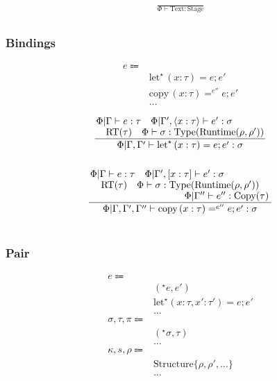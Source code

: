 \documentclass {article}
\begin{document}
\begin{gather*}
\frac
{}
{\Phi \vdash \text{Text} : \text{Stage}} \\
\end{gather*}

\subsubsection{Bindings}
\begin{align*}
e \Coloneqq & \\
& \text{let}^\star \, (x : \tau) = e; e' \tag{Runtime Let} \\
& \text{copy} \, (x : \tau) =^{e''} e; e' \tag{Runtime Copy Let} \\
& \dots
\end{align*}

\begin{gather*}
\frac
{\splitfrac{ \Phi | \Gamma \vdash e : \tau \quad \Phi | \Gamma', \langle x : \tau \rangle \vdash e' : \sigma}
{\text{RT}(\tau) \quad \Phi \vdash \sigma : \text{Type}(\text{Runtime}(\rho, \rho')) }}
{\Phi | \Gamma, \Gamma' \vdash \text{let}^\star \, (x : \tau) = e; e' : \sigma} \\
\\
\frac
{\splitfrac{ \Phi | \Gamma \vdash e : \tau \quad \Phi | \Gamma', [ x : \tau ] \vdash e' : \sigma}
{\splitfrac{\text{RT}(\tau) \quad \Phi \vdash \sigma : \text{Type}(\text{Runtime}(\rho, \rho')) }
{\Phi | \Gamma'' \vdash e'' : \text{Copy}(\tau)}}
}
{\Phi | \Gamma, \Gamma', \Gamma'' \vdash \text{copy} \, (x : \tau) =^{e''} e; e' : \sigma} \\
\end{gather*}

\begin{gather*}
\end{gather*}


\subsubsection{Pair}
\begin{align*}
e \Coloneqq & \\
& (^\star e, e') \tag{Runtime Pair Introduction} \\
& \text{let}^\star (x : \tau, x' : \tau') = e; e' \tag{Runtime Pair Elimination} \\
& \dots \\
\sigma, \tau, \pi \Coloneqq & \\
& (^\star \sigma, \tau) \tag{Runtime Pair} \\
& \dots \\
\kappa, s, \rho \Coloneqq & \\
& \text{Structure} \{ \rho, \rho', \dots \} \tag{Structure Representation} \\
& \dots
\end{align*}
\end{document}
